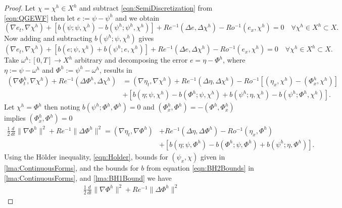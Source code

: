 \begin{proof}
  Let $\chi = \chi^h \in X^h$ and subtract \eqref{eqn:SemiDiscretization} from
  \eqref{eqn:QGEWF} then let $e:=\psi - \psi^h$ and we obtain
  \begin{equation*}
    (\nabla e_t, \nabla \chi^h) + \left[b(\psi;\psi,\chi^h) - b(\psi^h;\psi^h,\chi^h)\right]
      + Re^{-1}(\Delta e, \Delta \chi^h) - Ro^{-1} (e_x, \chi^h) = 0\quad
      \forall \chi^h \in X^h \subset X.
  \end{equation*}
  Now adding and subtracting $b(\psi^h;\psi,\chi^h)$ gives
  \begin{equation*}
    (\nabla e_t, \nabla \chi^h) + \left[b(e;\psi,\chi^h) + b(\psi^h;e,\chi^h)\right]
      + Re^{-1}(\Delta e, \Delta \chi^h) - Ro^{-1} (e_x, \chi^h) = 0\quad
      \forall \chi^h \in X^h \subset X.
  \end{equation*}
  Take $\omega^h:[0,T] \to X^h$ arbitrary and decomposing the error $e = \eta -
  \Phi^h$, where $\eta := \psi - \omega^h$ and $\Phi^h := \psi^h - \omega^h$,
  results in
  \begin{align*}
    (\nabla \Phi^h_t, \nabla \chi^h) + Re^{-1}(\Delta \Phi^h, \Delta \chi^h)
      & = (\nabla \eta_t, \nabla \chi^h) + Re^{-1}(\Delta \eta, \Delta \chi^h)
      - Ro^{-1} \left[(\eta_x, \chi^h) - (\Phi^h_x, \chi^h)\right] \\
    & + \left[ b(\eta;\psi,\chi^h) - b(\Phi^h;\psi,\chi^h)
      + b(\psi^h;\eta,\chi^h) - b(\psi^h;\Phi^h,\chi^h)\right].
  \end{align*}
  Let $\chi^h = \Phi^h$ then noting $b(\psi^h;\Phi^h,\Phi^h) = 0$ and $(\Phi^h_x,
  \Phi^h) = -(\Phi^h,\Phi^h_x)$ implies $(\Phi^h_x,\Phi^h) = 0$
  \begin{align*}
    \frac{1}{2} \frac{d}{dt} \|\nabla \Phi^h\|^2 + Re^{-1}\|\Delta \Phi^h\|^2
       = (\nabla \eta_t, \nabla \Phi^h) &+ Re^{-1}(\Delta \eta, \Delta \Phi^h)
      - Ro^{-1} (\eta_x, \Phi^h) \\
    & + \left[ b(\eta;\psi,\Phi^h) - b(\Phi^h;\psi,\Phi^h)
      + b(\psi^h;\eta,\Phi^h)\right].
  \end{align*}
  Using the H\"older inequality, \eqref{eqn:Holder}, bounds for $(\psi_x,\chi)$ given in
  \autoref{lma:ContinuousForms}, and the bounds for $b$ from
  equation \eqref{eqn:BH2Bounds} in \autoref{lma:ContinuousForms}, and \autoref{lma:BH1Bound} we have
  \begin{equation}
    \begin{split}
      \frac{1}{2} \frac{d}{dt} \|\nabla \Phi^h\|^2 + Re^{-1}\|\Delta \Phi^h\|^2

\end{split}
\end{equation}
\end{proof}
